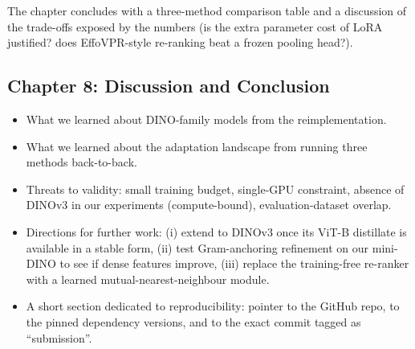\documentclass[11pt,a4paper]{article}
\begin{document}
The chapter concludes with a three-method comparison table and a
discussion of the trade-offs exposed by the numbers (is the extra
parameter cost of LoRA justified? does EffoVPR-style re-ranking beat a
frozen pooling head?).

\subsection*{Chapter 8: Discussion and Conclusion}

\begin{itemize}[leftmargin=*]
  \item What we learned about DINO-family models from the
  reimplementation.
  \item What we learned about the adaptation landscape from running
  three methods back-to-back.
  \item Threats to validity: small training budget, single-GPU
  constraint, absence of DINOv3 in our experiments (compute-bound),
  evaluation-dataset overlap.
  \item Directions for further work: (i) extend to DINOv3 once its
  ViT-B distillate is available in a stable form, (ii) test
  Gram-anchoring refinement on our mini-DINO to see if dense features
  improve, (iii) replace the training-free re-ranker with a learned
  mutual-nearest-neighbour module.
  \item A short section dedicated to reproducibility: pointer to the
  GitHub repo, to the pinned dependency versions, and to the exact
  commit tagged as ``submission''.
\end{itemize}

\newpage

\end{document}
